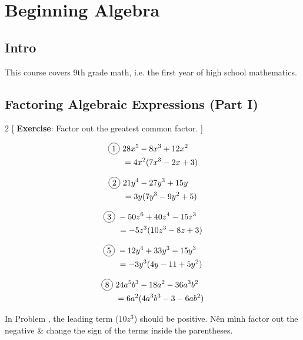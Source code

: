 \chapter{Beginning Algebra}

\section{Intro}

This course covers 9th grade math, i.e. the first year of high school mathematics.

\section{Factoring Algebraic Expressions (Part I)}

\begin{multicols}{2}
[
  \textbf{Exercise}: Factor out the greatest common factor.
]

\begin{align*}
  \circled{1}\ &28x^{5}-8x^{3}+12x^{2}\\
  &=4x^{2}(7x^{3}-2x+3)
\end{align*}

\begin{align*}
  \circled{2}\ &21y^{4}-27y^{3}+15y\\
  &=3y(7y^{3}-9y^{2}+5)
\end{align*}

\begin{align*}
  \circled{3}\ &-50z^{6}+40z^{4}-15z^{3}\\
  &=-5z^{3}(10z^{3}-8z+3)
\end{align*}

\begin{align*}
  \circled{5}\ &-12y^{4}+33y^{3}-15y^{3}\\
  &=-3y^{3}(4y-11+5y^{2})
\end{align*}

\begin{align*}
  \circled{8}\ &24a^{5}b^{3}-18a^{2}-36a^{3}b^{2}\\
  &=6a^{2}(4a^{3}b^{3}-3-6ab^{2})
\end{align*}

\end{multicols}

In Problem , the leading term ($10z^{3}$) should be positive. Nên mình factor out the negative \& change the sign of the terms inside the parentheses.

